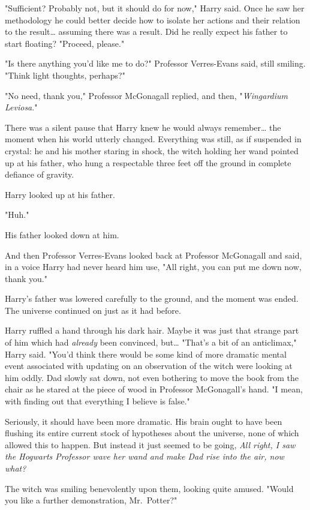 "Sufficient? Probably not, but it should do for now," Harry
said. Once he saw her methodology he could better decide
how to isolate her actions and their relation to the result{\ldots}
assuming there was a result. Did he really expect his
father to start floating? "Proceed, please."

"Is there anything you'd like me to do?" Professor
Verres-Evans said, still smiling. "Think light thoughts,
perhaps?"

"No need, thank you," Professor McGonagall replied, and
then, "\emph{Wingardium Leviosa}."

There was a silent pause that Harry knew he would
always remember{\ldots} the moment when his world utterly
changed. Everything was still, as if suspended in crystal:
he and his mother staring in shock, the witch holding her
wand pointed up at his father, who hung a respectable
three feet off the ground in complete defiance of gravity.

Harry looked up at his father.

"Huh."

His father looked down at him.

And then Professor Verres-Evans looked back at Professor
McGonagall and said, in a voice Harry had never heard him
use, "All right, you can put me down now, thank you."

Harry's father was lowered carefully to the ground, and the
moment was ended. The universe continued on just as it had before.

Harry ruffled a hand through his dark hair. Maybe it was
just that strange part of him which had \emph{already} been
convinced, but{\ldots} "That's a bit of an anticlimax," Harry said.
"You'd think there would be some kind of more dramatic
mental event associated with updating on an observation of
the witch were looking at him oddly. Dad slowly sat down,
not even bothering to move the book from the chair as
he stared at the piece of wood in Professor McGonagall's
hand. "I mean, with finding out that everything I believe is false."

Seriously, it should have been more dramatic. His brain
ought to have been flushing its entire current stock of
hypotheses about the universe, none of which allowed this
to happen. But instead it just seemed to be going, \emph{All
right, I saw the Hogwarts Professor wave her wand and
make Dad rise into the air, now what?}

The witch was smiling benevolently upon them, looking
quite amused. "Would you like a further demonstration, Mr.~Potter?"

